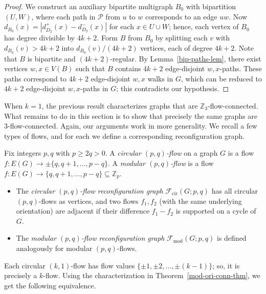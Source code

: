 \documentclass[a4paper,12pt]{article}
\theoremstyle{plain}
\theoremstyle{definition}
\newcommand{\Z}{\mathbb{Z}}
\renewcommand\ge\geqslant
\begin{document}
\begin{proof}
We construct an auxiliary bipartite multigraph $B_0$ with bipartition $(U,W)$, where each path in $\mathcal{P}$ 
from $u$ to $w$ corresponds to an edge $uw$. Now $d_{B_0}(x)=|d_{D_2}^+(x)-d_{D_2}^-(x)|$ for each $x\in U\cup W$; hence, each vertex of $B_0$ has degree divisible by $4k+2$.  Form $B$ from $B_0$ by splitting each $v$ with $d_{B_0}(v)>4k+2$ into $d_{B_0}(v)/(4k+2)$ vertices, each of degree $4k+2$.
Note that $B$ is bipartite and $(4k+2)$-regular. By Lemma~\ref{bip-paths-lem}, there exist vertices $w,x\in V(B)$ such that $B$ contains $4k+2$ edge-disjoint $w,x$-paths. These paths correspond to $4k+2$ edge-disjoint $w,x$ walks in $G$, which can be reduced to $4k+2$ edge-disjoint $w,x$-paths in $G$; this contradicts our hypothesis. 
\end{proof}

When $k=1$, the previous result characterizes graphs that are $\Z_3$-flow-connected. What remains to do in this section is to show that precisely the same graphs are $3$-flow-connected. Again, our arguments work in more generality. We recall a few types of flows, and for each we define a corresponding reconfiguration graph.

Fix integers $p,q$ with $p \ge 2q>0$. A \emph{circular $(p,q)$-flow} on a graph $G$ is a flow  $f:E(G)\to \pm\{q,q+1,\dots,p-q\}$. 
A \emph{modular $(p,q)$-flow} is a flow $f:E(G)\to \{q,q+1,\dots,p-q\}\subseteq \mathbb{Z}_p$.  

\begin{itemize}
\item The \emph{circular $(p,q)$-flow reconfiguration graph} $\mathcal{F}_{\mathrm{cir}}(G;p,q)$ has all circular $(p,q)$-flows as vertices, and two flows $f_1,f_2$ (with the same underlying orientation) are adjacent if their difference $f_1 - f_2$ is supported on a cycle of $G$.  

\item The \emph{modular $(p,q)$-flow reconfiguration graph} $\mathcal{F}_{\mathrm{mod}}(G;p,q)$ is defined analogously for modular $(p,q)$-flows.
\end{itemize}

Each circular $(k,1)$-flow has flow values $\{\pm 1,\pm 2, \ldots, \pm (k-1)\}$; so, it is precisely a $k$-flow. Using the characterization in Theorem~\ref{mod-ori-conn-thm}, we get the following equivalence.
\end{document}
